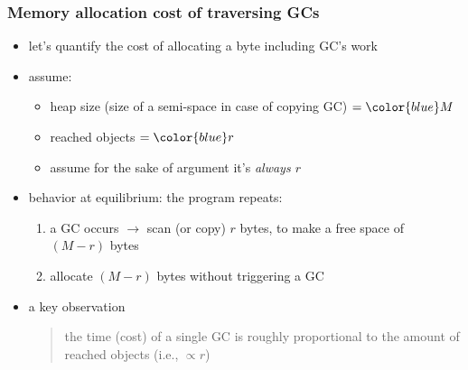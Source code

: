 \documentclass[11pt,dvipdfmx]{beamer}
\newcommand{\ao}[1]{{\color{blue}#1}}
\begin{document}
\begin{frame}
\frametitle{Memory allocation cost of traversing GCs}
\begin{itemize}
\item let's quantify
  \ao{the cost of
    allocating a byte} including GC's work
  
\item assume:
  \begin{itemize}
  \item heap size (size of a semi-space in case of copying GC) $= \ao{M}$
  \item reached objects $= \ao{r}$
  \item assume for the sake of argument it's \ao{\it always $r$}
  \end{itemize}

\item<3-> behavior at equilibrium: the program repeats:
  \begin{enumerate}
  \item a GC occurs $\rightarrow$ \ao{scan (or copy) $r$ bytes},
    to make a free space of $(M - r)$ bytes
  \item \ao{allocate $(M - r)$ bytes} without triggering a GC
  \end{enumerate}

\item<4-> a key observation
\begin{quote}
  \ao{the time (cost) of a single GC
  is roughly proportional to the amount of reached objects (i.e., $\propto r$)}
\end{quote}
  
\end{itemize}

\begin{center}
%
%
%
\end{center}

\end{frame}
\end{document}
